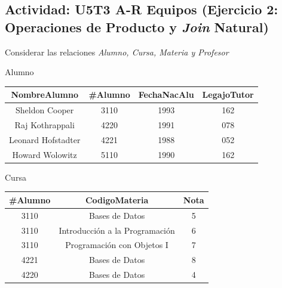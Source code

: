 \documentclass[a4paper, 12pt]{article}
\begin{document}
\begin{justify}
        \section{Actividad: U5T3 A-R Equipos (Ejercicio 2: Operaciones de Producto y \emph{Join} Natural)}
        \justify
        Considerar las relaciones \emph{Alumno, Cursa, Materia y Profesor}
        \begin{table}[H]
            Alumno\\
            \begin{tabular}{|c|c|c|c|}
            \hline
            \textbf{NombreAlumno} & \textbf{\#Alumno} & \textbf{FechaNacAlu} & \textbf{LegajoTutor} \\ \hline
            Sheldon Cooper        & 3110             & 1993                 & 162                  \\ \hline
            Raj Kothrappali       & 4220             & 1991                 & 078                  \\ \hline
            Leonard Hofstadter    & 4221             & 1988                 & 052                  \\ \hline
            Howard Wolowitz       & 5110             & 1990                 & 162                  \\ \hline
            \end{tabular}
        \end{table}
        \begin{table}[H]
            Cursa\\
            \begin{tabular}{|c|c|c|}
            \hline
            \textbf{\#Alumno} & \textbf{CodigoMateria}         & \textbf{Nota} \\ \hline
            3110             & Bases de Datos                 & 5             \\ \hline
            3110             & Introducción a la Programación & 6             \\ \hline
            3110             & Programación con Objetos I     & 7             \\ \hline
            4221             & Bases de Datos                 & 8             \\ \hline
            4220             & Bases de Datos                 & 4             \\ \hline
            \end{tabular}
        \end{table}
        \begin{table}[H]

\end{table}
\end{justify}
\end{document}
